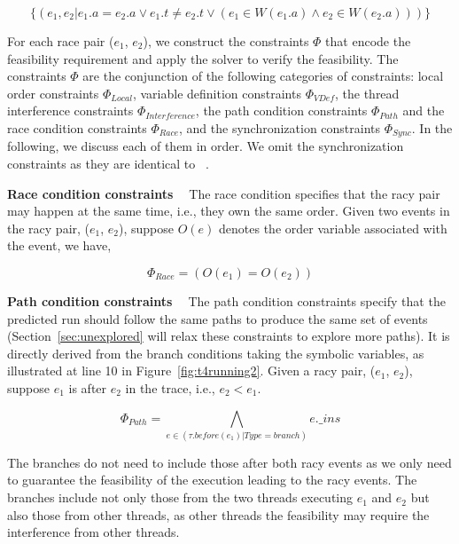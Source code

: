 $$
\{(e_1, e_2| e_1.a=e_2.a \vee e_1.t\neq e_2.t \vee (e_1\in W(e_1.a) \wedge e_2\in W(e_2.a) ))\}
$$


For each race pair ($e_1$, $e_2$), we construct the constraints $\Phi$ that encode the feasibility requirement and apply the solver to verify the feasibility. The constraints $\Phi$ are the conjunction of the following categories of constraints: local order constraints $\Phi_{Local}$, variable definition constraints $\Phi_{VDef}$, the thread interference constraints $\Phi_{Interference}$, the path condition constraints $\Phi_{Path}$ and the race condition constraints $\Phi_{Race}$, and the synchronization constraints $\Phi_{Sync}$. In the following, we discuss each of them in  order.
We omit the synchronization constraints as they are identical to ~\cite{jeff}.


{\bf Race condition constraints \ } The race condition specifies that the racy pair may happen at the same time, i.e., they own the same order. 
Given two events in the racy pair, ($e_1$, $e_2$), suppose $O(e)$ denotes the order variable associated with the event, we have,

$$
\Phi_{Race}= (O(e_1)=O(e_2))
$$




{\bf Path condition constraints \ } The path condition constraints specify that the predicted run should follow the same paths to produce the same set of events (Section~\ref{sec:unexplored} will relax these constraints to explore more paths).  It is directly derived from the branch conditions taking the symbolic variables, as illustrated at line 10 in Figure~\ref{fig:t4running2}.
Given a racy pair, ($e_1$, $e_2$), suppose $e_1$ is after $e_2$ in the trace, i.e., $e_2< e_1$. 

$$
\Phi_{Path}=\bigwedge_{e\in (\tau.before(e_1)|Type=branch)} e.\_ins 
$$

The branches do not need to include those after both racy events as we only need to guarantee the feasibility of the  execution leading to the racy events.
The branches include not only those from the two threads executing $e_1$ and $e_2$ but also those from other threads, as other threads the feasibility may require the interference from other threads.

